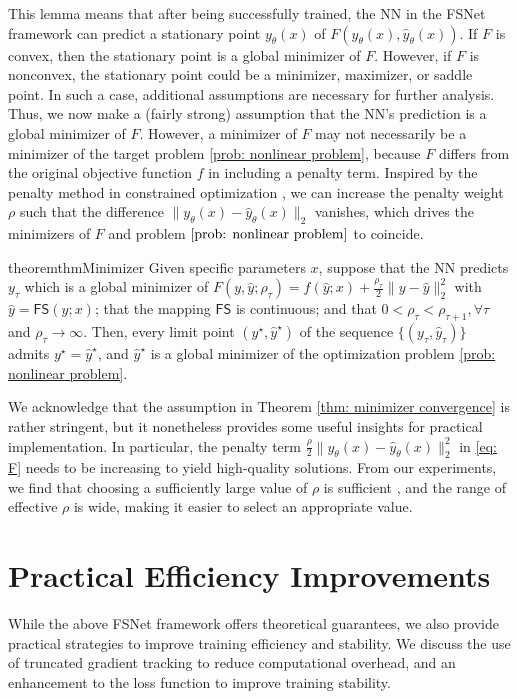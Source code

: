 \documentclass{article}
\def\FS{\mathsf{FS}}
\def\x{x}
\def\y{y_{\theta}}   \def\hy{\hat{y}_{\theta}}    \def\ty{\Tilde{y}}
\begin{document}
This lemma means that after being successfully trained, the NN in the FSNet framework can predict a stationary point $\y(\x)$ of $F(\y(\x), \hy(\x))$. 
If $F$ is convex, then the stationary point is a global minimizer of $F$. 
However, if $F$ is nonconvex, the stationary point could be a minimizer, maximizer, or saddle point.
In such a case, additional assumptions are necessary for further analysis. 
Thus, we now make a (fairly strong) assumption that the NN's prediction is a global minimizer of $F$.
However, a minimizer of $F$ may not necessarily be a minimizer of the target problem \eqref{prob: nonlinear problem}, because $F$ differs from the original objective function $f$ in including a penalty term. 
Inspired by the penalty method in constrained optimization \cite{nocedal1999numerical}, we can increase the penalty weight $\rho$ such that the difference $\| \y (\x) - \hy(\x) \|_2$ vanishes, which drives the minimizers of $F$ and problem $\eqref{prob: nonlinear problem}$ to coincide. %


\begin{restatable}{theorem}{thmMinimizer}\label{thm: minimizer convergence}
    Given specific parameters $\x$, suppose that the NN predicts $y_\tau$ which is a global minimizer of $F(y, \hat{y}; \rho_\tau) = f(\hat{y}; x) + \frac{\rho_\tau}{2} \| y - \hat{y}\|_2^2$ with $\hat{y} = \FS(y; x)$; that the mapping $\FS$ is continuous; and that $0 < \rho_\tau < \rho_{\tau+1}, \forall \tau$ and $\rho_\tau \rightarrow \infty$. Then, every limit point $(y^\star, \hat{y}^\star)$ of the sequence $\{(y_\tau, \hat{y}_\tau)\}$ admits $y^\star = \hat{y}^\star$, and $\hat{y}^\star$ is a global minimizer of the optimization problem \eqref{prob: nonlinear problem}. 
\end{restatable}

We acknowledge that the assumption in Theorem \ref{thm: minimizer convergence} is rather stringent, but it nonetheless provides some useful insights for practical implementation. 
In particular, the penalty term $\frac{\rho}{2} \|\y(\x)- \hy(\x)\|_2^2$ in \eqref{eq: F} needs to be increasing to yield high-quality solutions.
From our experiments, we find that choosing a sufficiently large value of $\rho$ is sufficient , and the range of effective $\rho$ is wide, making it easier to select an appropriate value.


\section{Practical Efficiency Improvements}\label{sec: improvement}
While the above FSNet framework offers theoretical guarantees, we also provide practical strategies to improve training efficiency and 
stability. 
We discuss the use of truncated gradient tracking to reduce computational overhead, and an enhancement to the loss function to improve training stability. 
\end{document}
